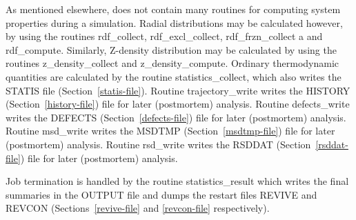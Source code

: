 As mentioned elsewhere, \D does not contain many routines for
computing system properties during a simulation.  Radial
distributions may be calculated however, by using the routines
{\sc rdf\_collect}, {\sc rdf\_excl\_collect},
{\sc rdf\_frzn\_collect} a and {\sc rdf\_compute}.
Similarly, Z-density distribution may be calculated by using the
routines {\sc z\_density\_collect} and {\sc z\_density\_compute}.
Ordinary thermodynamic quantities are calculated by the routine
{\sc statistics\_collect}, which also writes the STATIS file
(Section~\ref{statis-file}).  Routine {\sc trajectory\_write} writes the
HISTORY (Section~\ref{history-file}) file for later (postmortem)
analysis.  Routine {\sc defects\_write} writes the DEFECTS
(Section~\ref{defects-file}) file for later (postmortem) analysis.
Routine {\sc msd\_write} writes the MSDTMP (Section~\ref{msdtmp-file})
file for later (postmortem) analysis.  Routine {\sc rsd\_write}
writes the RSDDAT (Section~\ref{rsddat-file}) file for later
(postmortem) analysis.

Job termination is handled by the routine {\sc statistics\_result}
which writes the final summaries in the OUTPUT file and dumps the
restart files REVIVE and REVCON (Sections~\ref{revive-file} and
\ref{revcon-file} respectively).
